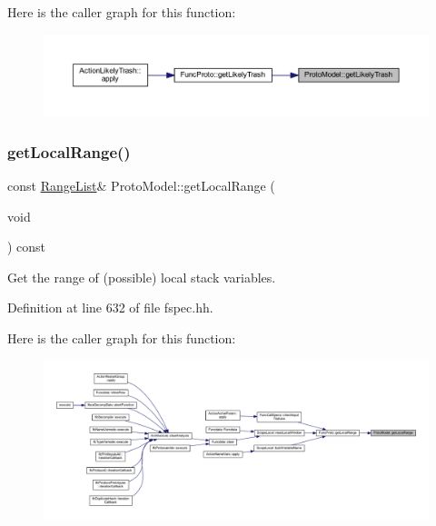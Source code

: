 Here is the caller graph for this function\+:
\nopagebreak
\begin{figure}[H]
\begin{center}
\leavevmode
\includegraphics[width=350pt]{class_proto_model_a1e6449c1c7d16d6ec396d29e58042cad_icgraph}
\end{center}
\end{figure}
\mbox{\label{class_proto_model_a4736d007016235f93ae81100f8312e26}} 
\subsubsection{\texorpdfstring{getLocalRange()}{getLocalRange()}}
{\footnotesize\ttfamily const \mbox{\hyperlink{class_range_list}{Range\+List}}\& Proto\+Model\+::get\+Local\+Range (\begin{DoxyParamCaption}\item[{void}]{ }\end{DoxyParamCaption}) const\hspace{0.3cm}{\ttfamily [inline]}}



Get the range of (possible) local stack variables. 



Definition at line 632 of file fspec.\+hh.

Here is the caller graph for this function\+:
\nopagebreak
\begin{figure}[H]
\begin{center}
\leavevmode
\includegraphics[width=350pt]{class_proto_model_a4736d007016235f93ae81100f8312e26_icgraph}
\end{center}
\end{figure}
\mbox{\label{class_proto_model_a0a6e71fa168f7af91d6b658516a61326}} 
